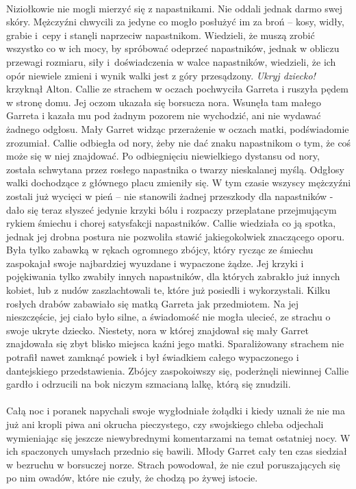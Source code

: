 \documentclass[10pt,twoside,twocolumn]{book}
\begin{document}
\paragraph{}
Niziołkowie nie mogli mierzyć się z napastnikami.
Nie oddali jednak darmo swej skóry.
Mężczyźni chwycili za jedyne co mogło posłużyć im za broń – kosy, widły, grabie i cepy i stanęli naprzeciw napastnikom.
Wiedzieli, że muszą zrobić wszystko co w ich mocy, by spróbować odeprzeć napastników, jednak w obliczu przewagi rozmiaru, siły i doświadczenia w walce napastników, wiedzieli, że ich opór niewiele zmieni i wynik walki jest z góry przesądzony.
\emph{Ukryj dziecko!} krzyknął Alton.
Callie ze strachem w oczach pochwyciła Garreta i ruszyła pędem w stronę domu.
Jej oczom ukazała się borsucza nora.
Wsunęła tam małego Garreta i kazała mu pod żadnym pozorem nie wychodzić, ani nie wydawać żadnego odgłosu.
Mały Garret widząc przerażenie w oczach matki, podświadomie zrozumiał.
Callie odbiegła od nory, żeby nie dać znaku napastnikom o tym, że coś może się w niej znajdować.
Po odbiegnięciu niewielkiego dystansu od nory, została schwytana przez rosłego napastnika o twarzy nieskalanej myślą.
Odgłosy walki dochodzące z głównego placu zmieniły się.
W tym czasie wszyscy mężczyźni zostali już wycięci w pień – nie stanowili żadnej przeszkody dla napastników - dało się teraz słyszeć jedynie krzyki bólu i rozpaczy przeplatane przejmującym rykiem śmiechu i chorej satysfakcji napastników.
Callie wiedziała co ją spotka, jednak jej drobna postura nie pozwoliła stawić jakiegokolwiek znaczącego oporu.
Była tylko zabawką w rękach ogromnego zbójcy, który rycząc ze śmiechu zaspokajał swoje najbardziej wyuzdane i wypaczone żądze.
Jej krzyki i pojękiwania tylko zwabiły innych napastników, dla których zabrakło już innych kobiet, lub z nudów zaszlachtowali te, które już posiedli i wykorzystali.
Kilku rosłych drabów zabawiało się matką Garreta jak przedmiotem.
Na jej nieszczęście, jej ciało było silne, a świadomość nie mogła ulecieć, ze strachu o swoje ukryte dziecko.
Niestety, nora w której znajdował się mały Garret znajdowała się zbyt blisko miejsca kaźni jego matki.
Sparaliżowany strachem nie potrafił nawet zamknąć powiek i był świadkiem całego wypaczonego i dantejskiego przedstawienia.
Zbójcy zaspokoiwszy się, poderżnęli niewinnej Callie gardło i odrzucili na bok niczym szmacianą lalkę, którą się znudzili.

\paragraph{}
Całą noc i poranek napychali swoje wygłodniałe żołądki i kiedy uznali że nie ma już ani kropli piwa ani okrucha pieczystego, czy swojskiego chleba odjechali wymieniając się jeszcze niewybrednymi komentarzami na temat ostatniej nocy.
W ich spaczonych umysłach przednio się bawili.
Młody Garret cały ten czas siedział w bezruchu w borsuczej norze.
Strach powodował, że nie czuł poruszających się po nim owadów, które nie czuły, że chodzą po żywej istocie.
\end{document}

